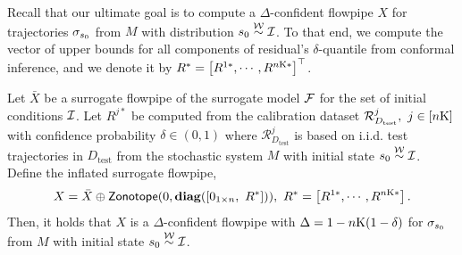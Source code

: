




Recall that our ultimate goal is to compute a $\Delta$-confident flowpipe  $X$ for trajectories $\sigma_{s_0}$ from $M$ with distribution $s_0 \stackrel{\mathcal{W}}{\sim} \mathcal{I}$. To that end, we compute the vector of upper bounds for all components of residual's $\delta$-quantile from conformal inference, and we denote it by $R^* = \left[ R^{1*},\cdots,R^{{n\mathrm{K}}*} \right]^\top$.



\begin{theorem}\label{lem:inclusion_conformal}
Let $\bar{X}$ be a surrogate flowpipe of the surrogate model $\mathcal{F}$ for the set of initial conditions $\mathcal{I}$. Let $R^{j*}$ be computed from the calibration dataset $\mathcal{R}_{D_{\text{test}}}^{j},\ j \in [n\mathrm{K}]$ with confidence probability $\delta\in (0,1)$ where $\mathcal{R}_{D_\text{test}}^j$ is based on i.i.d. test trajectories in $D_{\text{test}}$ from the stochastic system $M$ with initial state $s_0 \stackrel{\mathcal{W}}{\sim} \mathcal{I}$.  Define the inflated surrogate flowpipe,
$$
X = \bar{X} \oplus \zon(0, \mathbf{diag}([0_{1\times n},\ R^*])),\ 
R^* = \left[ R^{1*},\cdots,R^{{n\horizon}*} \right].
$$
Then, it holds that $X$ is a $\Delta$-confident flowpipe with $\Delta = 1-n\mathrm{K}(1-\delta)$ for $\sigma_{s_0}$ from $M$ with initial state $s_0 \stackrel{\mathcal{W}}{\sim} \mathcal{I}$.

\end{theorem}

